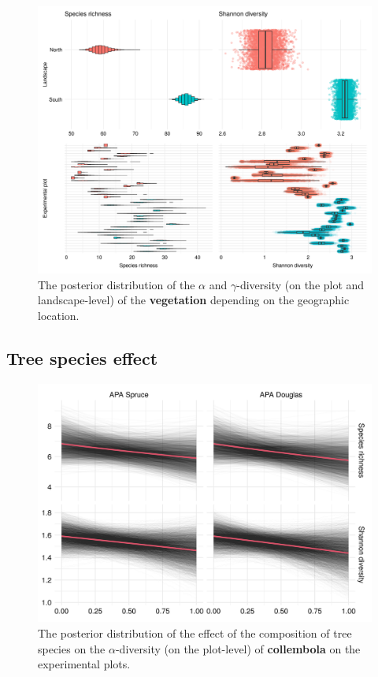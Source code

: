 \documentclass{article}
\begin{document}
\begin{figure}[ht!]
\centering
\includegraphics[width=\linewidth]{figures/rtg-diversity-veg-geo}
\caption{The posterior distribution of the $\alpha$ and $\gamma$-diversity (on the plot and landscape-level) of the \textbf{vegetation} depending on the geographic location.}
\label{fig:rtg-diversity-veg-geo}
\end{figure}

\clearpage
\subsection*{Tree species effect}

\begin{figure}[ht!]
\centering
\includegraphics[width=.7\linewidth]{figures/rtg-diversity-col-apa}
\caption{The posterior distribution of the effect of the composition of tree species on the $\alpha$-diversity (on the plot-level) of \textbf{collembola} on the experimental plots.}
\label{fig:rtg-diversity-col-apa}
\end{figure}
\end{document}
